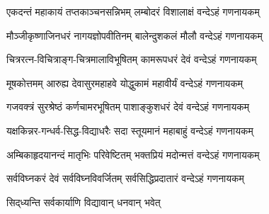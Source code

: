 
\twolineshloka
{एकदन्तं महाकायं तप्तकाञ्चनसन्निभम्}
{लम्बोदरं विशालाक्षं वन्देऽहं गणनायकम्}

\twolineshloka
{मौञ्जीकृष्णाजिनधरं नागयज्ञोपवीतिनम्}
{बालेन्दुशकलं मौलौ वन्देऽहं गणनायकम्}

\twolineshloka
{चित्ररत्न-विचित्राङ्ग-चित्रमालाविभूषितम्}
{कामरूपधरं देवं वन्देऽहं गणनायकम्}

\twolineshloka
{मूषकोत्तमम् आरुह्य देवासुरमहाहवे}
{योद्धुकामं महावीर्यं वन्देऽहं गणनायकम्}

\twolineshloka
{गजवक्त्रं सुरश्रेष्ठं कर्णचामरभूषितम्}
{पाशाङ्कुशधरं देवं वन्देऽहं गणनायकम्}

\twolineshloka
{यक्षकिन्नर-गन्धर्व-सिद्ध-विद्याधरैः सदा}
{स्तूयमानं महाबाहुं वन्देऽहं गणनायकम्}

\twolineshloka
{अम्बिकाहृदयानन्दं मातृभिः परिवेष्टितम्}
{भक्तप्रियं मदोन्मत्तं वन्देऽहं गणनायकम्}

\twolineshloka
{सर्वविघ्नकरं देवं सर्वविघ्नविवर्जितम्}
{सर्वसिद्धिप्रदातारं वन्देऽहं गणनायकम्}

{सिद्‌ध्यन्ति सर्वकार्याणि विद्यावान् धनवान् भवेत्}